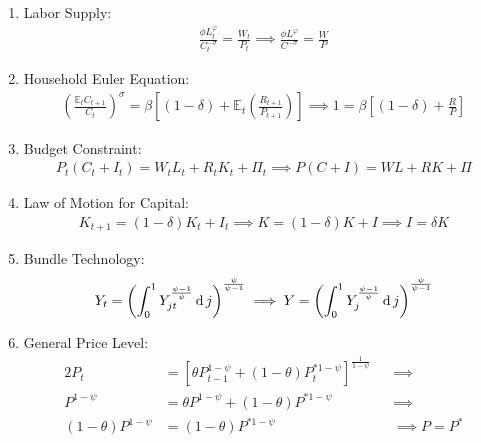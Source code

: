 \documentclass[
	thesis.tex
	]{subfiles}
\begin{document}
\begin{enumerate}
	\item Labor Supply:
	\begin{align}
		\label{eq:ss-household-labor-supply}
		\frac{\phi L_t^{\varphi}}{C_t^{-\sigma}} = \frac{W_t}{P_t} \implies
		\frac{\phi L^{\varphi}}{C^{-\sigma}} = \frac{W}{P}
	\end{align}
	
	\item Household Euler Equation: 
	\begin{align}
		\label{eq:ss-household-euler-equation}
		\left( \frac{\mathbb{E}_t C_{t+1}}{C_t} \right)^\sigma = \beta \left[ (1-\delta) + \mathbb{E}_t \left(\frac{R_{t+1}}{P_{t+1}}\right) \right] \implies 
		1 = \beta \left[ (1-\delta) + \frac{R}{P} \right]
	\end{align}
	
	\item Budget Constraint: 
	\begin{align}
		\label{eq:ss-household-budget-constraint}
		P_t (C_t + I_t) = W_t L_t + R_t K_t + \Pi_t \implies 
		P (C + I) = W L + R K + \Pi
	\end{align}
	
	\item Law of Motion for Capital:
	\begin{align}
		\label{eq:ss-law-of-motion-for-capital}
		K_{t+1} = (1-\delta)K_t + I_t \implies
		K = (1-\delta)K + I \implies I = \delta K
	\end{align}
	
	\item Bundle Technology:
	\begin{align}
		\label{eq:ss-final-good-firm-bundle-rule}
		Y_t = \left( \int_{0}^{1} Y_{jt}^{\frac{\psi-1}{\psi}} \operatorname{d} j \right)^{\frac{\psi}{\psi-1}} \implies 
		Y = \left( \int_{0}^{1} Y_{j}^{\frac{\psi-1}{\psi}} \operatorname{d} j \right)^{\frac{\psi}{\psi-1}}
	\end{align}
	
	\item General Price Level:
	\begin{alignat}{2}
		\label{eq:ss-general-price-level}
		P_t &= \left[ \theta P_{t-1}^{1-\psi} + (1-\theta) P_t^{\ast 1-\psi} \right]^\frac{1}{1-\psi} &&\implies \nonumber \\
		P^{1-\psi} &= \theta P^{1-\psi} + (1-\theta) P^{\ast 1-\psi} &&\implies \nonumber \\ 
		(1-\theta) P^{1-\psi} &= (1-\theta) P^{\ast 1-\psi} &&\implies P = P^\ast
	\end{alignat}
	

\end{enumerate}
\end{document}
